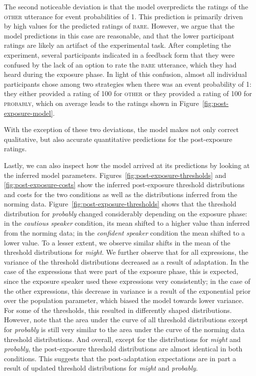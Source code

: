 \documentclass[man, floatsintext]{apa6}
\newcommand{\figref}[1]{Figure~\ref{#1}}
\begin{document}
The second noticeable deviation is that the model overpredicts the ratings of the \textsc{other} utterance for event probabilities of 1. This prediction is primarily driven by high values for the predicted ratings of \textsc{bare}. However, we argue that the model predictions in this case are reasonable, and that the lower participant ratings are likely an artifact of the experimental task. After completing the experiment, 
several participants indicated in a feedback form that they were confused by the lack of an option to rate the \textsc{bare} utterance, 
which they had heard during the exposure phase. In light of this confusion, almost all individual participants chose among two strategies when there was an event probability of 1: they either provided a rating of 100 for \textsc{other} 
or they provided a rating of 100 for \textsc{probably}, which on average leads to the ratings shown in \figref{fig:post-exposure-model}.

With the exception of these two deviations, the model makes not only correct qualitative, but also accurate quantitative predictions for the post-exposure ratings.

Lastly, we can also inspect how the model arrived at its predictions by looking at the inferred model parameters.  
Figures~\ref{fig:post-exposure-thresholds} and \ref{fig:post-exposure-costs} show the inferred
post-exposure threshold distributions and costs for the two conditions as well as the distributions inferred from the norming data.
Figure~\ref{fig:post-exposure-thresholds} shows that the threshold distribution for \textit{probably}
changed considerably depending on the exposure phase: in the \textit{cautious speaker} condition,
its mean shifted to a higher value than  inferred from the norming data; in the \textit{confident speaker} condition the mean 
shifted to a lower value. To a lesser extent, we observe similar shifts in the mean of the threshold
distributions for \textit{might}. We further observe that for all expressions, the variance of the threshold
distributions decreased as a result of adaptation. In the case of the expressions that were part of the exposure
phase, this is expected, since the exposure speaker used these expressions very consistently; in the case of the
other expressions, this decrease in variance is a result of the exponential prior over the population parameter,
which biased the model towards lower variance. For some of the thresholds, this resulted in differently shaped distributions.
However, note that the area under the curve of all threshold distributions except for \textit{probably} is still very similar to the 
area under the curve of the norming data threshold distributions. And overall, except for the distributions
for \textit{might} and \textit{probably}, the post-exposure threshold distributions are almost identical in both conditions.
This suggests that the post-adaptation expectations 
are in part a result of updated threshold distributions for \textit{might} and \textit{probably}.
\end{document}
